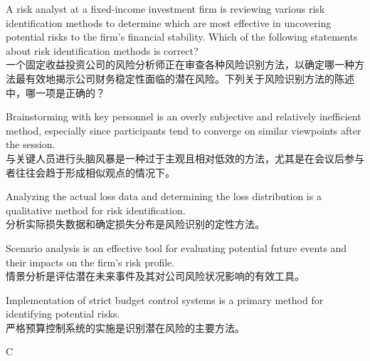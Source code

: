 \documentclass{article}
\newcounter{question} %
\begin{document}
\begin{question}
    A risk analyst at a fixed-income investment firm is reviewing various risk identification methods to determine which are most effective in uncovering potential risks to the firm's financial stability. Which of the following statements about risk identification methods is correct? \\
    一个固定收益投资公司的风险分析师正在审查各种风险识别方法，以确定哪一种方法最有效地揭示公司财务稳定性面临的潜在风险。下列关于风险识别方法的陈述中，哪一项是正确的？
\end{question}
    
\begin{choices}
    \item Brainstorming with key personnel is an overly subjective and relatively inefficient method, especially since participants tend to converge on similar viewpoints after the session. \\
    与关键人员进行头脑风暴是一种过于主观且相对低效的方法，尤其是在会议后参与者往往会趋于形成相似观点的情况下。
    
    \item Analyzing the actual loss data and determining the loss distribution is a qualitative method for risk identification. \\
    分析实际损失数据和确定损失分布是风险识别的定性方法。
    
    \item Scenario analysis is an effective tool for evaluating potential future events and their impacts on the firm's risk profile. \\
    情景分析是评估潜在未来事件及其对公司风险状况影响的有效工具。
    
    \item Implementation of strict budget control systems is a primary method for identifying potential risks. \\
    严格预算控制系统的实施是识别潜在风险的主要方法。
\end{choices}

\begin{correctanswer}
    C
\end{correctanswer}
\end{document}

